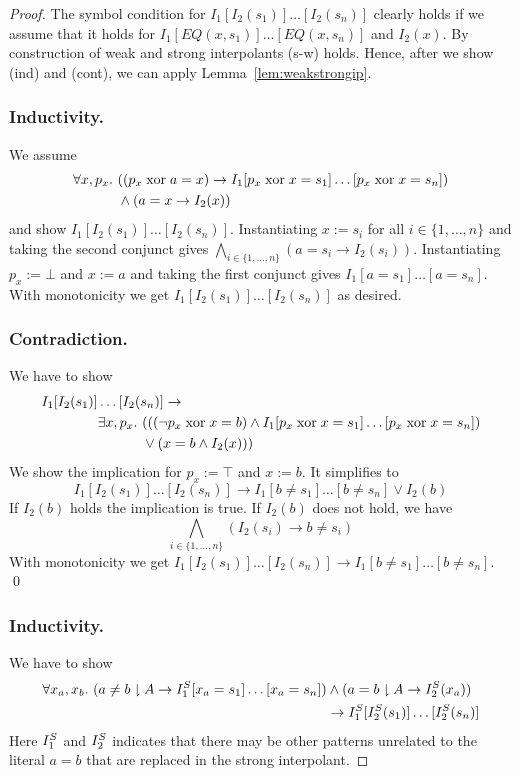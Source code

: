 \begin{techreport}
\begin{proof}
The symbol condition for $I_1[I_2(s_1)]\dots[I_2(s_n)]$ clearly holds
if we assume that it holds for $I_1[EQ(x,s_1)]\dots[EQ(x,s_n)]$ and $I_2(x)$. 
\ifnewinterpolation\else
By construction of weak and strong interpolants (s-w) holds. 
\fi
Hence, after
we show (ind) and (cont), we can apply Lemma~\ref{lem:weakstrongip}.

\ifnewinterpolation
\subsubsection*{Inductivity.}
We assume
\begin{align*}
\forall x,p_x.~ &((p_x \xor a = x) \rightarrow I_1[p_x \xor x=s_1]\dots[p_x \xor x=s_n])\\
&\land (a = x \rightarrow I_2(x))
\end{align*}
and show $I_1[I_2(s_1)]\dots[I_2(s_n)]$.
Instantiating $x:= s_i$ for all $i\in\{1,\dots,n\}$
and taking the second conjunct gives
$\bigwedge_{i\in\{1,\dots,n\}} (a=s_i \rightarrow I_2(s_i))$.
%
Instantiating $p_x:=\bot$ and $x:=a$ and taking the first conjunct gives
$I_1[a=s_1]\dots[a=s_n]$.  
%
With monotonicity we get
$I_1[I_2(s_1)]\dots[I_2(s_n)]$ as desired.


\subsubsection*{Contradiction.}
We have to show
\begin{align*}
I_1[I_2(s_1)]&\ldots[I_2(s_n)] \rightarrow \\
&\exists x,p_x.~(((\lnot p_x \xor x=b) \land I_1[p_x \xor x = s_1]\dots[p_x \xor x = s_n])\\
&\hphantom{\exists x,p_x.~}\lor (x=b \land I_2(x)))
\end{align*}
%
We show the implication for $p_x:=\top$ and $x:=b$.  It simplifies to
\[ I_1[I_2(s_1)]\dots[I_2(s_n)] \rightarrow 
I_1[b \neq s_1]\dots[b \neq s_n] \lor I_2(b)
\]
If $I_2(b)$ holds the implication is true.
If $I_2(b)$ does not hold, we have 
\[\bigwedge_{i\in\{1,\dots,n\}} (I_2(s_i) \rightarrow b \neq s_i)\]
With monotonicity we get $I_1[I_2(s_1)]\dots[I_2(s_n)]
\rightarrow I_1[b\neq s_1]\dots[b\neq s_n]$.
\qed
\else
\subsubsection*{Inductivity.}
We have to show
\begin{align*}
\forall x_a,x_b.~ (a\neq b \proj A \rightarrow I_1\S[x_a=s_1]\dots[x_a=s_n])
&\land (a= b \proj A \rightarrow I_2\S(x_a))\\
& \rightarrow
I_1\S[I_2\S(s_1)]\dots[I_2\S(s_n)]
\end{align*}
Here $I_1\S$ and $I_2\S$ indicates that there may be other patterns unrelated
to the literal $a=b$ that are replaced in the strong interpolant.


\end{proof}
\end{techreport}
